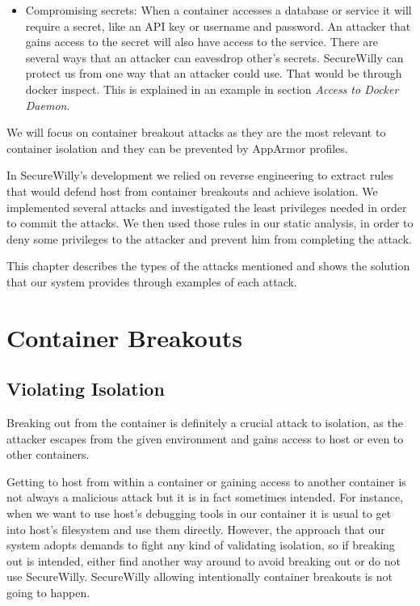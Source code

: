 \begin{itemize}
\item Compromising secrets: When a container accesses a database or service it will require a secret, like an API key or username and password. An attacker that gains access to the secret will also have access to the service.
There are several ways that an attacker can eavesdrop other's secrets. SecureWilly can protect us from one way that an attacker could use. That would be through docker inspect. This is explained in an example in section \textit{Access to Docker Daemon}.

\end{itemize}

We will focus on container breakout attacks as they are the most relevant to container isolation and they can be prevented by AppArmor profiles.

In SecureWilly's development we relied on reverse engineering to extract rules that would defend host from container breakouts and achieve isolation. We implemented several attacks and investigated the least privileges needed in order to commit the attacks. We then used those rules in our static analysis, in order to deny some privileges to the attacker and prevent him from completing the attack.

This chapter describes the types of the attacks mentioned and shows the solution that our system provides through examples of each attack.

\section{Container Breakouts}
\subsection{Violating Isolation}
Breaking out from the container is definitely a crucial attack to isolation, as the attacker escapes from the given environment and gains access to host or even to other containers.

Getting to host from within a container or gaining access to another container is not always a malicious attack but it is in fact sometimes intended. For instance, when we want to use host's debugging tools in our container it is usual to get into host's filesystem and use them directly.
However, the approach that our system adopts demands to fight any kind of validating isolation, so if breaking out is intended, either find another way around to avoid breaking out or do not use SecureWilly. SecureWilly allowing intentionally container breakouts is not going to happen.

